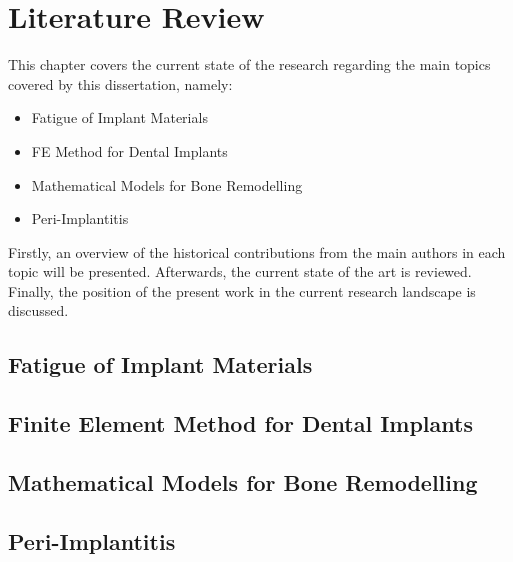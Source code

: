 
\chapter{Literature Review}
\label{chap:LitRev}
This chapter covers the current state of the research regarding the main topics covered by this dissertation, namely:

\begin{itemize}
	\item Fatigue of Implant Materials
	\item \gls{FE} Method for Dental Implants
	\item Mathematical Models for Bone Remodelling
	\item Peri-Implantitis
\end{itemize}

Firstly, an overview of the historical contributions from the main authors in each topic will be presented.
Afterwards, the current state of the art is reviewed.
Finally, the position of the present work in the current research landscape is discussed.

\section{Fatigue of Implant Materials}

\section{Finite Element Method for Dental Implants}

\section{Mathematical Models for Bone Remodelling}

\section{Peri-Implantitis}


